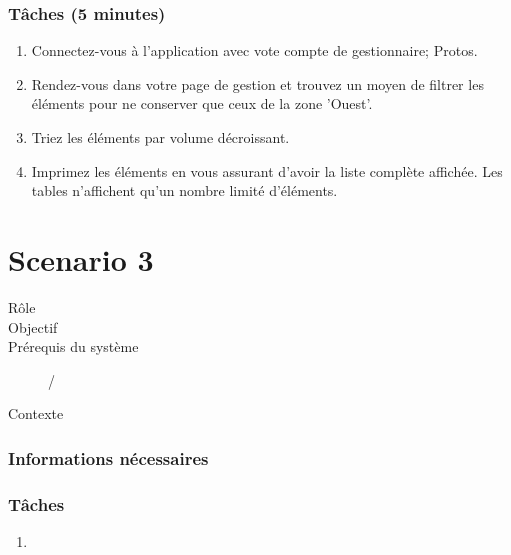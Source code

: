 \documentclass[a4paper, 11pt]{article}
\begin{document}
    \subsubsection*{Tâches (5 minutes)}
        \begin{enumerate}
            \item Connectez-vous à l'application avec vote compte de gestionnaire; Protos.
            \item Rendez-vous dans votre page de gestion et trouvez un moyen de filtrer les éléments pour ne conserver que ceux de la zone 'Ouest'.
            \item Triez les éléments par volume décroissant.
            \item Imprimez les éléments en vous assurant d'avoir la liste complète affichée. Les tables n'affichent qu'un nombre limité d'éléments.
        \end{enumerate}

\newpage

\section*{Scenario 3}
    \begin{description}
        \item[Rôle]
        \item[Objectif]
        \item[Prérequis du système] /
        \item[Contexte]
    \end{description}

    \subsubsection*{Informations nécessaires}

    \subsubsection*{Tâches}
        \begin{enumerate}
            \item
        \end{enumerate}

\newpage
\end{document}
